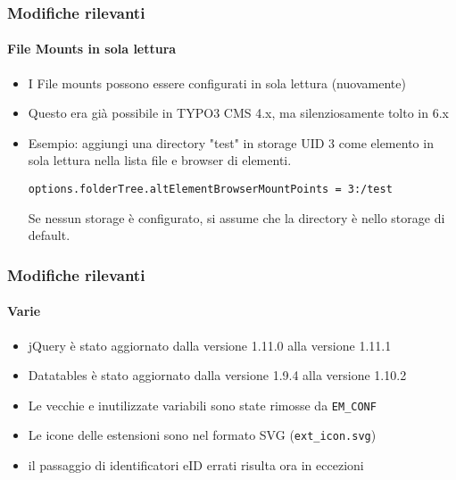 
\begin{frame}[fragile]
	\frametitle{Modifiche rilevanti}
	\framesubtitle{File Mounts in sola lettura}

	\begin{itemize}

		\item I File mounts possono essere configurati in sola lettura (nuovamente)
		\item Questo era già possibile in TYPO3 CMS 4.x, ma silenziosamente tolto in 6.x
		\item Esempio: aggiungi una directory "test" in storage UID 3 come elemento in sola lettura nella lista file e browser di elementi.\newline

			\smaller\texttt{options.folderTree.altElementBrowserMountPoints = 3:/test}\normalsize\newline

			Se nessun storage è configurato, si assume che la directory è nello storage di default.
	\end{itemize}

\end{frame}


\begin{frame}[fragile]
	\frametitle{Modifiche rilevanti}
	\framesubtitle{Varie}

	\begin{itemize}
		\item jQuery è stato aggiornato dalla versione 1.11.0 alla versione 1.11.1
		\item Datatables è stato aggiornato dalla versione 1.9.4 alla versione 1.10.2
		\item Le vecchie e inutilizzate variabili sono state rimosse da \texttt{EM\_CONF}
		\item Le icone delle estensioni sono nel formato SVG (\texttt{ext\_icon.svg})
		\item il passaggio di identificatori eID errati risulta ora in eccezioni
	\end{itemize}

\end{frame}

